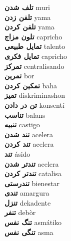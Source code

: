 \textbf{ تلف شدن  } muri \\
\textbf{ تلفن زدن  } yama \\
\textbf{ تلفن کردن  } yama \\
\textbf{ تلون مزاج  } capricho \\
\textbf{ تمایل طبیعی  } talento \\
\textbf{ تمایل فکری  } capricho \\
\textbf{ تمرکز  } centralisando \\
\textbf{ تمرین  } bor \\
\textbf{ تمکین کردن  } baha \\
\textbf{ تمیز  } diskriminashon \\
\textbf{ تن در دادن  } konsentí \\
\textbf{ تناسب  } balans \\
\textbf{ تنبیه  } castigo \\
\textbf{ تند شدن  } acelera \\
\textbf{ تند کردن  } acelera \\
\textbf{ تند  } ásido \\
\textbf{ تندتر شدن  } acelera \\
\textbf{ تندتر کردن  } catalisa \\
\textbf{ تندرستی  } bienestar \\
\textbf{ تندی  } amargura \\
\textbf{ تنزل  } dekadente \\
\textbf{ تنفر  } debòr \\
\textbf{ تنگ نفس  } asmátiko \\
\textbf{ تنگی نفس  } asma \\
